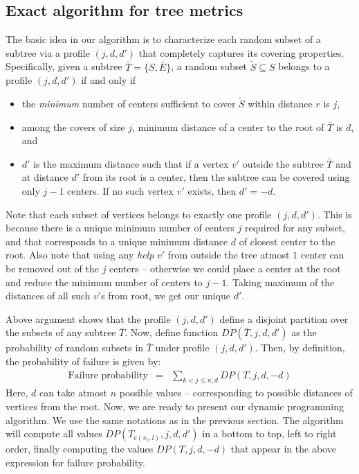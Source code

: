 \documentclass[11pt,onecolumn]{article}
\begin{document}
\subsection{Exact algorithm for tree metrics}
The basic idea in our algorithm is to characterize each random subset of a subtree via a profile $(j,d,d')$ that completely captures its covering properties. Specifically, given a subtree $\bar{T}=\{S,\bar{E}\}$, a random subset $\tilde{S}\subseteq S$ belongs to a profile $(j,d,d')$ if and only if
\begin{itemize}
\item the {\it minimum} number of centers sufficient to cover $\tilde{S}$ within distance $r$ is $j$,
\item among the covers of size $j$, minimum distance of a center to the root of $\bar{T}$ is $d$, and
\item $d'$ is the maximum distance such that if a vertex $v'$ outside the subtree $\bar{T}$ and at distance $d'$ from its root is a center, then the subtree can be covered using only $j-1$ centers. 
If no such vertex $v'$ exists, then $d'=-d$. 
\end{itemize}
Note that each subset of vertices belongs to exactly one profile $(j, d, d')$. This is because there is a unique minimum
number of centers $j$ required for any subset, and that corresponds to a unique minimum distance $d$ of closest center
to the root. Also note that using any {\it help} $v'$ from 
outside the tree atmost $1$ center can be removed out of the $j$ centers -- otherwise we could place a center at the root and reduce the minimum  number of centers to $j-1$. Taking maximum of the distances of all such $v'$s from root, we get our unique $d'$. 

Above argument shows that the profile $(j,d,d')$ define a disjoint partition over the subsets of any subtree $\bar{T}$. 
Now, define function $DP(\bar{T},j,d,d')$ as the probability of random subsets in $\bar{T}$ under profile $(j,d,d')$. Then, by definition, the probability of failure is given by:
\begin{eqnarray}
\mbox{Failure probability} & = & \sum_{k<j\le n, d} DP(T, j, d, -d) 
\end{eqnarray}
Here, $d$ can take atmost $n$ possible values -- corresponding to possible distances of vertices from the root.
Now, we are ready to present our dynamic programming algorithm. We use the same notations as in the previous section. The algorithm will compute all values $DP(T_{e(v_1,l)},j, d, d')$ in a bottom to top, left to right order, finally computing the values $DP(T, j, d, -d)$ that appear in the above expression for failure probability.
\end{document}
